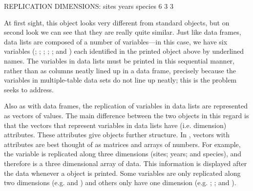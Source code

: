 \documentclass[a4paper]{report}
\numberwithin{exercise}{section}
\begin{document}
\begin{article}
\begin{Schunk}
\begin{Soutput}
REPLICATION DIMENSIONS: 
  sites   years species 
      6       3       3 
\end{Soutput}
\end{Schunk}

At first sight, this  object looks very different from standard  objects, but on second look we can see that they are really quite similar.  Just like data frames, data lists are composed of a number of variables---in this case, we have six variables (; ; ; ; ; and ) each identified in the printed object above by underlined names.  The variables in data lists must be printed in this sequential manner, rather than as columns neatly lined up in a data frame, precisely because the variables in multiple-table data sets do not line up neatly; this is the problem  seeks to address.

Also as with data frames, the replication of variables in data lists are represented as vectors of values.  The main difference between the two objects in this regard is that the vectors that represent variables in data lists have  (i.e. dimension) attributes.  These  attributes give  objects further structure.  In \R, vectors with  attributes are best thought of as matrices and arrays of numbers.  For example, the  variable is replicated along three dimensions (sites; years; and species), and therefore is a three dimensional array of data.  This information is displayed after the data whenever a  object is printed.  Some variables are only replicated along two dimensions (e.g.  and ) and others only have one dimension (e.g. ; ; and ).  



\end{article}
\end{document}
